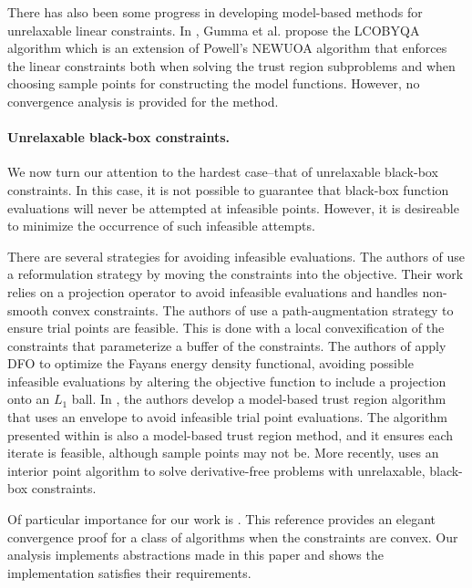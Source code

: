 There has also been some progress in developing model-based methods for unrelaxable linear constraints.   In  \cite{gumma.hashim.ea:derivative-free},  Gumma et al.  propose the LCOBYQA algorithm which is an extension of Powell's NEWUOA algorithm that enforces the linear constraints both when solving the trust region subproblems and when choosing sample points for constructing the model functions.    However, no convergence analysis is provided for the method.   

\paragraph*{Unrelaxable black-box constraints.}   
We now turn our attention to the hardest case--that of unrelaxable black-box constraints.   In this case,  it is not possible to guarantee that black-box function evaluations will never be attempted at infeasible points.   However, it is desireable to minimize the occurrence of such infeasible attempts.  

There are several strategies for avoiding infeasible evaluations.
The authors of \cite{Galvan2021} use a reformulation strategy by moving the constraints into the objective.
Their work relies on a projection operator to avoid infeasible evaluations and handles non-smooth convex constraints.
The authors of \cite{NOWPAC2014} use a path-augmentation strategy to ensure trial points are feasible.
This is done with a local convexification of the constraints that parameterize a buffer of the constraints.
The authors of \cite{BMNORW2020} apply DFO to optimize the Fayans energy density functional, avoiding possible infeasible evaluations by altering the objective function to include a projection onto an $L_1$ ball.
In \cite{CONORBIT15}, the authors develop a model-based trust region algorithm that uses an envelope to avoid infeasible trial point evaluations.
The algorithm presented within \cite{Conejo2015} is also a model-based trust region method, and it ensures each iterate is feasible, although sample points may not be.
More recently, \cite{Brilli2021interior} uses an interior point algorithm to solve derivative-free problems with unrelaxable, black-box constraints.

Of particular importance for our work is \cite{Conejo:2013:GCT:2620806.2621814}.
This reference provides an elegant convergence proof for a class of algorithms when the constraints are convex.
Our analysis implements abstractions made in this paper and shows the implementation satisfies their requirements.

